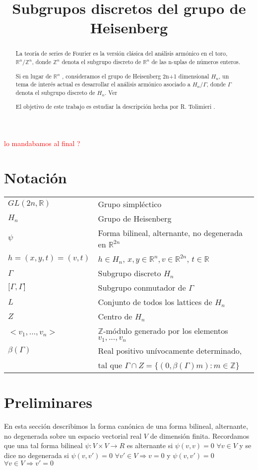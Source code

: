 \documentclass[12pt]{article}
\title{Subgrupos discretos del grupo de Heisenberg }
\date{}
\begin{document}
\maketitle

\begin{abstract}
La teoría de series de Fourier es la versión clásica del análisis armónico en el toro,
$\mathbb{R}^n /\mathbb{Z}^n$, donde $\mathbb{Z}^n$ denota el subgrupo discreto de $\mathbb{R}^n$ de
las n-uplas de números enteros.

Si en lugar de $\mathbb{R}^n$ , consideramos el grupo de Heisenberg 2n+1 dimensional $H_n$, un tema
de interés actual es desarrollar el análisis armónico asociado a $H_n/\Gamma$, donde $\Gamma$ 
denota el subgrupo discreto de $H_n$. Ver \cite{Th} 

El objetivo de este trabajo es estudiar la descripción hecha por R. Tolimieri \cite{To}.

\end{abstract}

\textcolor{red}{lo mandabamos al final ?}
\section{Notación}
\begin{tabular}{ l l }
  $GL(2n,\mathbb{R})$ & Grupo simpléctico\\
  $H_n$ & Grupo de Heisenberg \\
  $\psi$ & Forma bilineal, alternante, no degenerada  en $\mathbb{R}^{2n}$ \\
  $h=(x,y,t)=(v,t)$ & $h \in H_n$, $x,y \in \mathbb{R}^n,v \in \mathbb{R}^{2n}$, $t \in \mathbb{R}$ \\
  $\Gamma$ & Subgrupo discreto $H_n$ \\
  ${[}\Gamma,\Gamma{]}$ & Subgrupo conmutador de $\Gamma$ \\
  $L$ & Conjunto de todos los lattices de $H_n$ \\
  $Z$ & Centro de $H_n$ \\
  $<v_1,...,v_n>$ & $\mathbb{Z}$-módulo generado por los elementos $v_1,...,v_n$\\
  $\beta(\Gamma)$ & Real positivo unívocamente determinado,\\  
  & tal que $\Gamma \cap Z =\{(0,\beta(\Gamma) m): m\in \mathbb{Z} \}$ \\
\end{tabular}


 

\section{Preliminares}
En esta sección describimos la forma canónica de una forma bilineal,
alternante, no degenerada sobre un espacio vectorial real $V$ de dimensión finita. 
Recordamos que una tal forma bilineal $\psi :V\times V\rightarrow R$
es alternante si $\psi(v,v)=0$ $\forall v \in V$  y se dice no degenerada si 
$\psi(v,v')=0$ $\forall v' \in V \Rightarrow v = 0$  y 
$\psi(v,v')=0$ $\forall v \in V \Rightarrow v' = 0$
\end{document}
